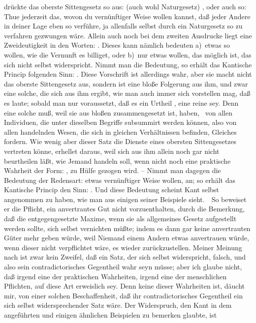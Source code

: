 \begin{aufza}
\item {} drückte das oberste Sittengesetz so aus:  (auch wohl Naturgesetz) , oder auch so: Thue jederzeit das, wovon du vernünftiger Weise wollen kannst, daß jeder Andere in deiner Lage eben so verführe, ja allenfalls selbst durch ein Naturgesetz so zu verfahren gezwungen wäre. Allein auch noch bei dem zweiten Ausdrucke liegt eine Zweideutigkeit in den Worten: . Dieses kann nämlich bedeuten a)~etwas so wollen, wie die Vernunft es billiget, oder b)~nur etwas wollen, das möglich ist, das sich nicht selbst widerspricht. Nimmt man die  Bedeutung, so erhält das Kantische Princip folgenden Sinn: . Diese Vorschrift ist allerdings wahr, aber sie macht nicht das oberste Sittengesetz aus, sondern ist eine bloße Folgerung aus ihm, und zwar eine solche, die sich aus ihm ergibt, wie man auch immer sich vorstellen mag, daß es laute; sobald man nur voraussetzt, daß es ein Urtheil , eine reine  sey. Denn eine solche muß, weil sie aus bloßen  zusammengesetzt ist,  haben, \dh\ von allen Individuen, die unter dieselben Begriffe subsummirt werden können, also von allen handelnden Wesen, die sich in gleichen Verhältnissen befinden, Gleiches fordern. Wie wenig aber dieser Satz die Dienste eines obersten Sittengesetzes vertreten könne, erhellet daraus, weil sich aus ihm allein noch gar nicht beurtheilen läßt, wie Jemand handeln soll, wenn nicht noch eine  praktische Wahrheit der Form: , zu Hülfe gezogen wird. -- Nimmt man dagegen die  Bedeutung der Redensart: etwas vernünftiger Weise wollen, an; so erhält das Kantische Princip den Sinn: . Und diese Bedeutung scheint Kant selbst angenommen zu haben, wie man aus einigen seiner Beispiele sieht.~\ So beweiset er die Pflicht, ein anvertrautes Gut nicht vorzuenthalten, durch die Bemerkung, daß die entgegengesetzte Maxime, wenn sie als allgemeines Gesetz aufgestellt werden sollte, sich selbst vernichten müßte; indem es dann gar keine anvertrauten Güter mehr geben würde, weil Niemand einem Andern etwas anvertrauen würde, wenn dieser nicht verpflichtet wäre, es wieder zurückzustellen. Meiner Meinung nach ist zwar kein Zweifel, daß ein Satz, der sich selbst widerspricht, falsch, und also sein contradictorisches Gegentheil wahr seyn müsse; aber ich glaube nicht, daß irgend eine der praktischen Wahrheiten, irgend eine der menschlichen Pflichten, auf diese Art erweislich sey. Denn keine dieser Wahrheiten ist, däucht mir, von einer solchen Beschaffenheit, daß ihr contradictorisches Gegentheil ein sich selbst widersprechender Satz wäre. Der Widerspruch, den Kant in dem angeführten und einigen ähnlichen Beispielen zu bemerken glaubte, ist 
\end{aufza}
